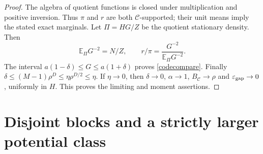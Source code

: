 \documentclass[11pt]{article}
\newcommand{\E}{\mathbb E}
\begin{document}
\begin{proof}
The algebra of quotient functions is closed under multiplication and positive inversion. Thus $\pi$ and $r$ are both $\mathcal C$-supported; their unit means imply the stated exact marginals. Let $\Pi=HG/Z$ be the quotient stationary density. Then
\[
 \E_\Pi G^{-2}=N/Z,\qquad r/\pi=\frac{G^{-2}}{\E_\Pi G^{-2}}.
\]
The interval $a(1-\delta)\leq G\leq a(1+\delta)$ proves \eqref{codecompare}. Finally
$\delta\leq(M-1)\rho^D\leq\eta\rho^{D/2}\leq\eta$. If $\eta\to0$, then $\delta\to0$, $\alpha\to1$, $B_{\mathcal C}\to\rho$ and $\varepsilon_{\rm gap}\to0$, uniformly in $H$. This proves the limiting and moment assertions.
\end{proof}

\section{Disjoint blocks and a strictly larger potential class}
\end{document}
